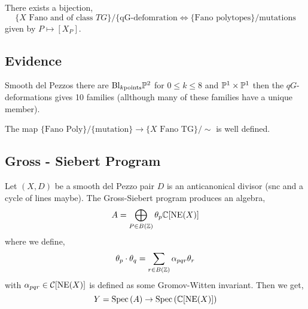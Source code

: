 \documentclass[12pt]{article}
\begin{document}
\begin{conjecture}
There exists a bijection,
\[ \{ X \text{ Fano and of class } TG \} / \{ \text{qG-defomration} \iff \{ \text{Fano polytopes} \} / \text{mutations} \]
given by $P \mapsto [X_P]$. 
\end{conjecture}

\subsection{Evidence}

Smooth del Pezzos there are $\mathrm{Bl}_{k \text{points}} \P^2$ for $0 \le k \le 8$ and $\P^1 \times \P^1$ then the $qG$-deformations gives 10 families (allthough many of these families have a unique member). 

\begin{thm}
The map $ \{ \text{Fano Poly} \} / \{\text{mutation}\} \to \{ X \text{ Fano TG} \} / \sim$ is well defined.
\end{thm}

\subsection{Gross - Siebert Program}

Let $(X, D)$ be a smooth del Pezzo pair $D$ is an anticanonical divisor (snc and a cycle of lines maybe). The Gross-Siebert program produces an algebra,
\[ A = \bigoplus_{P \in B(\Z)} \theta_p \CC[\mathrm{NE}(X)] \]
where we define,
\[ \theta_p \cdot \theta_q = \sum_{r \in B(\Z)} \alpha_{pqr} \theta_r \]
with $\alpha_{pqr} \in \C[\mathrm{NE}(X)]$ is defined as some Gromov-Witten invariant. Then we get,
\[ Y = \Spec{A} \to \Spec{\CC[\mathrm{NE}(X)]} \]
\end{document}
